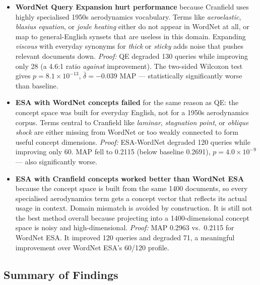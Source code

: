 \documentclass{article}
\begin{document}
\begin{itemize}
\item \textbf{WordNet Query Expansion hurt performance} because Cranfield uses highly specialised 1950s aerodynamics vocabulary. Terms like \textit{aeroelastic}, \textit{blasius equation}, or \textit{joule heating} either do not appear in WordNet at all, or map to general-English synsets that are useless in this domain. Expanding \textit{viscous} with everyday synonyms for \textit{thick} or \textit{sticky} adds noise that pushes relevant documents down. \textit{Proof:} QE degraded 130 queries while improving only 28 (a 4.6:1 ratio \emph{against} improvement). The two-sided Wilcoxon test gives $p = 8.1 \times 10^{-13}$, $\bar{\delta} = -0.039$ MAP --- statistically significantly worse than baseline.

\item \textbf{ESA with WordNet concepts failed} for the same reason as QE: the concept space was built for everyday English, not for a 1950s aerodynamics corpus. Terms central to Cranfield like \textit{laminar}, \textit{stagnation point}, or \textit{oblique shock} are either missing from WordNet or too weakly connected to form useful concept dimensions. \textit{Proof:} ESA-WordNet degraded 120 queries while improving only 60. MAP fell to 0.2115 (below baseline 0.2691), $p = 4.0 \times 10^{-9}$ --- also significantly worse.

\item \textbf{ESA with Cranfield concepts worked better than WordNet ESA} because the concept space is built from the same 1400 documents, so every specialised aerodynamics term gets a concept vector that reflects its actual usage in context. Domain mismatch is avoided by construction. It is still not the best method overall because projecting into a 1400-dimensional concept space is noisy and high-dimensional. \textit{Proof:} MAP 0.2963 vs.\ 0.2115 for WordNet ESA. It improved 120 queries and degraded 71, a meaningful improvement over WordNet ESA's 60/120 profile.

\end{itemize}

\subsection{Summary of Findings}
\end{document}
